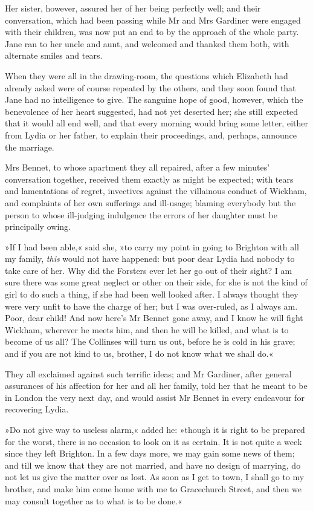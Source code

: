 Her sister, however, assured her of her being perfectly well; and their conversation, which had been passing while Mr and Mrs Gardiner were engaged with their children, was now put an end to by the approach of the whole party. Jane ran to her uncle and aunt, and welcomed and thanked them both, with alternate smiles and tears.

When they were all in the drawing-room, the questions which Elizabeth had already asked were of course repeated by the others, and they soon found that Jane had no intelligence to give. The sanguine hope of good, however, which the benevolence of her heart suggested, had not yet deserted her; she still expected that it would all end well, and that every morning would bring some letter, either from Lydia or her father, to explain their proceedings, and, perhaps, announce the marriage.

Mrs Bennet, to whose apartment they all repaired, after a few minutes' conversation together, received them exactly as might be expected; with tears and lamentations of regret, invectives against the villainous conduct of Wickham, and complaints of her own sufferings and ill-usage; blaming everybody but the person to whose ill-judging indulgence the errors of her daughter must be principally owing.

»If I had been able,« said she, »to carry my point in going to Brighton with all my family, \textit{this} would not have happened: but poor dear Lydia had nobody to take care of her. Why did the Forsters ever let her go out of their sight? I am sure there was some great neglect or other on their side, for she is not the kind of girl to do such a thing, if she had been well looked after. I always thought they were very unfit to have the charge of her; but I was over-ruled, as I always am. Poor, dear child! And now here's Mr Bennet gone away, and I know he will fight Wickham, wherever he meets him, and then he will be killed, and what is to become of us all? The Collinses will turn us out, before he is cold in his grave; and if you are not kind to us, brother, I do not know what we shall do.«

They all exclaimed against such terrific ideas; and Mr Gardiner, after general assurances of his affection for her and all her family, told her that he meant to be in London the very next day, and would assist Mr Bennet in every endeavour for recovering Lydia.

»Do not give way to useless alarm,« added he: »though it is right to be prepared for the worst, there is no occasion to look on it as certain. It is not quite a week since they left Brighton. In a few days more, we may gain some news of them; and till we know that they are not married, and have no design of marrying, do not let us give the matter over as lost. As soon as I get to town, I shall go to my brother, and make him come home with me to Gracechurch Street, and then we may consult together as to what is to be done.«

